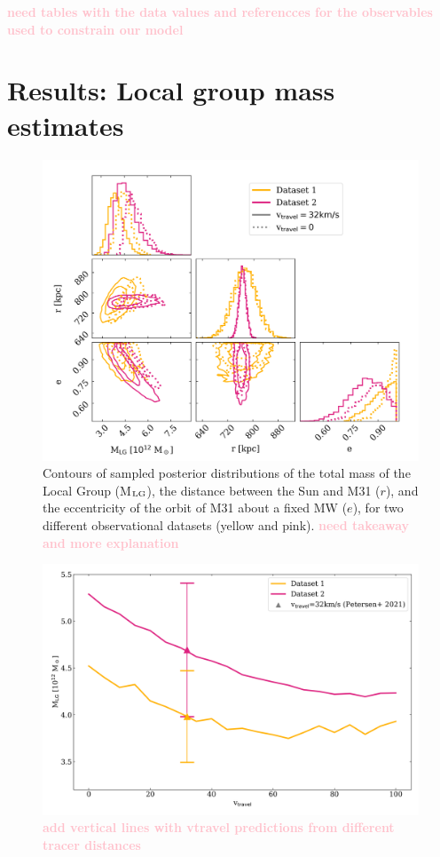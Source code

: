 \documentclass[twocolumn]{aastex631}
\newcommand{\mlg}{M$_{\rm LG}$}
\newcommand{\kc}[1]{\textcolor{pink}{\textbf{#1}} }
\begin{document}
\kc{need tables with the data values and referencces for the observables used to constrain our model}

\section{Results: Local group mass estimates}
\label{sec:results}

\begin{figure}[htb]
  \centering
  \includegraphics[width=\textwidth]{analyze-runs-contour.png}
  \caption{\label{fig:contour} Contours of sampled posterior distributions of the total mass of the Local Group (\mlg), the distance between the Sun and M31 ($r$), and the eccentricity of the orbit of M31 about a fixed MW ($e$), for two different observational datasets (yellow and pink).  \kc{need takeaway and more explanation}
  }
\end{figure}

\begin{figure}[htb]
    \centering
    \includegraphics[width=\columnwidth]{analyze-runs-MvV.png}
    \caption{\label{fig:contour} \kc{add vertical lines with vtravel predictions from different tracer distances }
    }
  \end{figure}
\end{document}
